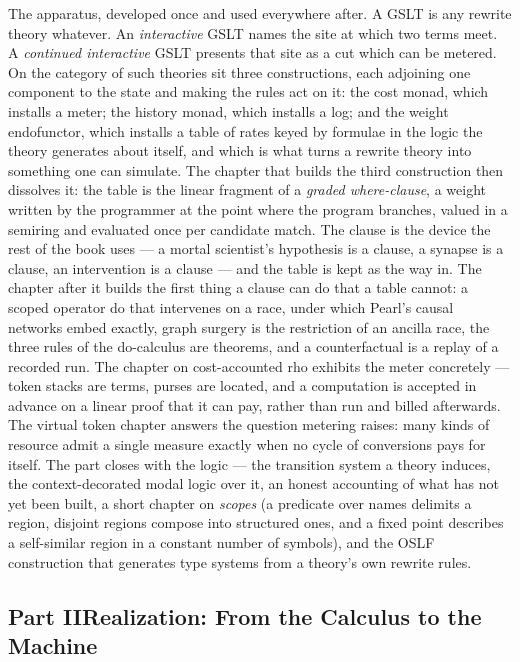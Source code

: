 \documentclass[12pt,openright,twoside]{book}
\theoremstyle{remark}
\theoremstyle{plain}
\theoremstyle{remark}
\theoremstyle{plain}
\theoremstyle{plain}
\begin{document}
The apparatus, developed once and used everywhere after.
A GSLT is any rewrite theory whatever.
An \emph{interactive} GSLT names the site at which two terms meet.
A \emph{continued interactive} GSLT presents that site as a cut which can
be metered.
On the category of such theories sit three constructions, each adjoining
one component to the state and making the rules act on it: the cost
monad, which installs a meter; the history monad, which installs a log;
and the weight endofunctor, which installs a table of rates keyed by
formulae in the logic the theory generates about itself, and which is
what turns a rewrite theory into something one can simulate.
The chapter that builds the third construction then dissolves it: the
table is the linear fragment of a \emph{graded where-clause}, a weight
written by the programmer at the point where the program branches, valued
in a semiring and evaluated once per candidate match.  The clause is the
device the rest of the book uses --- a mortal scientist's hypothesis is a
clause, a synapse is a clause, an intervention is a clause --- and the
table is kept as the way in.
The chapter after it builds the first thing a clause can do that a table
cannot: a scoped operator \textsf{do} that intervenes on a race, under
which Pearl's causal networks embed exactly, graph surgery is the
restriction of an ancilla race, the three rules of the do-calculus are
theorems, and a counterfactual is a replay of a recorded run.
The chapter on cost-accounted rho exhibits the meter concretely --- token
stacks are terms, purses are located, and a computation is accepted in
advance on a linear proof that it can pay, rather than run and billed
afterwards.
The virtual token chapter answers the question metering raises: many
kinds of resource admit a single measure exactly when no cycle of
conversions pays for itself.
The part closes with the logic --- the transition system a theory
induces, the context-decorated modal logic over it, an honest accounting
of what has not yet been built, a short chapter on \emph{scopes} (a
predicate over names delimits a region, disjoint regions compose into
structured ones, and a fixed point describes a self-similar region in a
constant number of symbols), and the OSLF construction that generates
type systems from a theory's own rewrite rules.

\subsection*{Part II\quad Realization: From the Calculus to the Machine}
\end{document}
